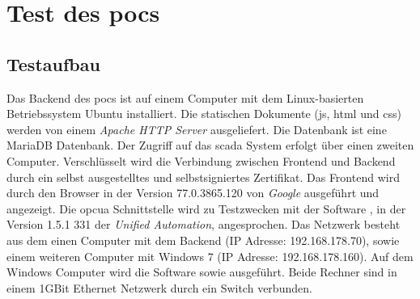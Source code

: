 \section{Test des \acp{poc} }\label{sec:poc:test}
\subsection{Testaufbau}
Das Backend des \acp{poc} ist auf einem Computer mit dem Linux-basierten Betriebssystem Ubuntu installiert. 
Die statischen Dokumente (\ac{js}, \ac{html} und \ac{css}) werden von einem \emph{Apache HTTP Server} \citep{apache} ausgeliefert.
Die Datenbank ist eine MariaDB Datenbank.
Der Zugriff auf das \ac{scada} System erfolgt über einen zweiten Computer.
Verschlüsselt wird die Verbindung zwischen Frontend und Backend durch ein selbst ausgestelltes und selbstsigniertes Zertifikat.
Das Frontend wird durch den Browser  in der Version 77.0.3865.120 von \emph{Google} ausgeführt und angezeigt.
Die \ac{opcua} Schnittstelle wird zu Testzwecken mit der Software , in der Version 1.5.1 331 der \emph{Unified Automation}, angesprochen.
Das Netzwerk besteht aus dem einen Computer mit dem Backend (IP Adresse: 192.168.178.70), sowie einem weiteren Computer mit Windows 7 (IP Adresse: 192.168.178.160).
Auf dem Windows Computer wird die Software  sowie  ausgeführt.
Beide Rechner sind in einem 1GBit Ethernet Netzwerk durch ein Switch verbunden.

